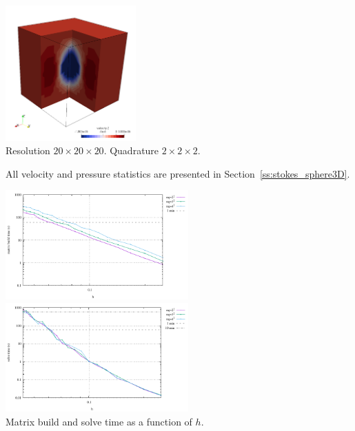 \begin{center}
\includegraphics[width=5cm]{python_codes/fieldstone_82/results/sphere/w.png}\\
{\captionfont Resolution $20\times 20\times 20$. Quadrature $2\times 2 \times 2$.} 
\end{center}

All velocity and pressure statistics are presented in Section~\ref{ss:stokes_sphere3D}.

\begin{center}
\includegraphics[width=7cm]{python_codes/fieldstone_82/results/sphere/build.pdf}
\includegraphics[width=7cm]{python_codes/fieldstone_82/results/sphere/solve.pdf}\\
{\captionfont Matrix build and solve time as a function of $h$.}
\end{center}
